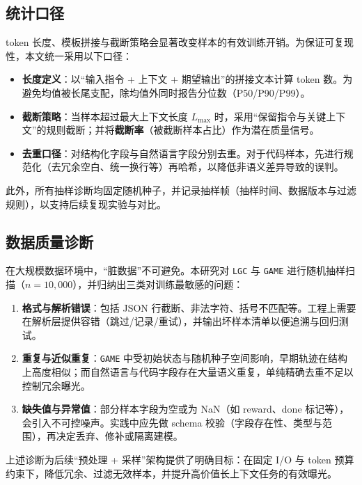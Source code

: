 \documentclass[UTF8]{article}
\begin{document}
\subsection{统计口径}\label{sec:protocol}

token 长度、模板拼接与截断策略会显著改变样本的有效训练开销。为保证可复现性，本文统一采用以下口径：
\begin{itemize}
    \item \textbf{长度定义}：以“输入指令 + 上下文 + 期望输出”的拼接文本计算 token 数。为避免均值被长尾支配，除均值外同时报告分位数（P50/P90/P99）。
    \item \textbf{截断策略}：当样本超过最大上下文长度 $L_{\max}$ 时，采用“保留指令与关键上下文”的规则截断；并将\textbf{截断率}（被截断样本占比）作为潜在质量信号。
    \item \textbf{去重口径}：对结构化字段与自然语言字段分别去重。对于代码样本，先进行规范化（去冗余空白、统一换行等）再哈希，以降低非语义差异导致的误判。
\end{itemize}

此外，所有抽样诊断均固定随机种子，并记录抽样帧（抽样时间、数据版本与过滤规则），以支持后续复现实验与对比。

\subsection{数据质量诊断}\label{sec:quality_diagnosis}

在大规模数据环境中，“脏数据”不可避免。本研究对 \texttt{LGC} 与 \texttt{GAME} 进行随机抽样扫描（$n=10{,}000$），并归纳出三类对训练最敏感的问题：
\begin{enumerate}
    \item \textbf{格式与解析错误}：包括 JSON 行截断、非法字符、括号不匹配等。工程上需要在解析层提供容错（跳过/记录/重试），并输出坏样本清单以便追溯与回归测试。
    \item \textbf{重复与近似重复}：\texttt{GAME} 中受初始状态与随机种子空间影响，早期轨迹在结构上高度相似；而自然语言与代码字段存在大量语义重复，单纯精确去重不足以控制冗余曝光。
    \item \textbf{缺失值与异常值}：部分样本字段为空或为 NaN（如 reward、done 标记等），会引入不可控噪声。实践中应先做 schema 校验（字段存在性、类型与范围），再决定丢弃、修补或隔离建模。
\end{enumerate}

上述诊断为后续“预处理 + 采样”架构提供了明确目标：在固定 I/O 与 token 预算约束下，降低冗余、过滤无效样本，并提升高价值长上下文任务的有效曝光。
\end{document}
